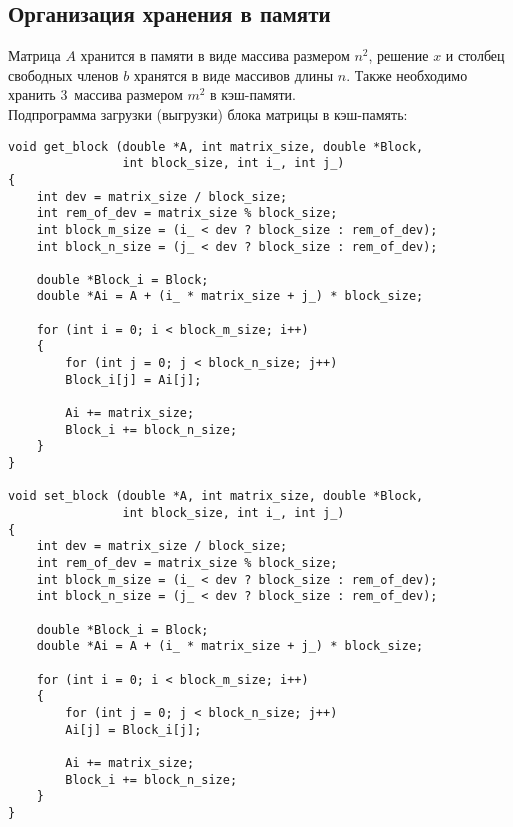 \documentclass[a4paper, fontsize=14pt]{article}
\begin{document}
		\subsection{Организация хранения в памяти}
		Матрица $A$ хранится в памяти в виде массива размером $n^2$, решение $x$ и столбец свободных членов $b$ хранятся в виде массивов длины $n$. Также необходимо хранить $3\,$ массива размером $m^2$ в кэш-памяти.
		\\Подпрограмма загрузки (выгрузки) блока матрицы в кэш-память:
		\begin{lstlisting}
void get_block (double *A, int matrix_size, double *Block,
                int block_size, int i_, int j_)
{
	int dev = matrix_size / block_size;
	int rem_of_dev = matrix_size % block_size;
	int block_m_size = (i_ < dev ? block_size : rem_of_dev);
	int block_n_size = (j_ < dev ? block_size : rem_of_dev);
	
	double *Block_i = Block;
	double *Ai = A + (i_ * matrix_size + j_) * block_size;
	
	for (int i = 0; i < block_m_size; i++)
	{
		for (int j = 0; j < block_n_size; j++)
		Block_i[j] = Ai[j];
		
		Ai += matrix_size;
		Block_i += block_n_size;
	}
}

void set_block (double *A, int matrix_size, double *Block,
                int block_size, int i_, int j_)
{
	int dev = matrix_size / block_size;
	int rem_of_dev = matrix_size % block_size;
	int block_m_size = (i_ < dev ? block_size : rem_of_dev);
	int block_n_size = (j_ < dev ? block_size : rem_of_dev);
	
	double *Block_i = Block;
	double *Ai = A + (i_ * matrix_size + j_) * block_size;
	
	for (int i = 0; i < block_m_size; i++)
	{
		for (int j = 0; j < block_n_size; j++)
		Ai[j] = Block_i[j];
		
		Ai += matrix_size;
		Block_i += block_n_size;
	}
}
		\end{lstlisting}
		
\end{document}
